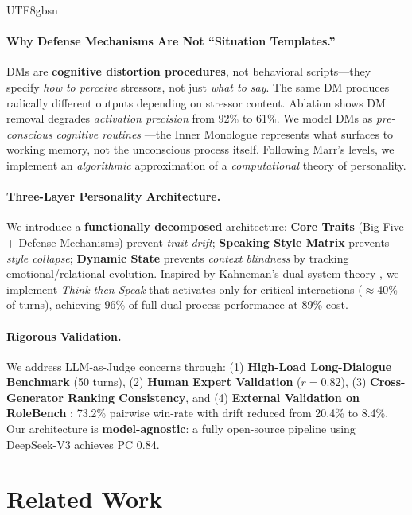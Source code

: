 \documentclass[11pt]{article}
\begin{document}
\begin{CJK*}{UTF8}{gbsn}
\paragraph{Why Defense Mechanisms Are Not ``Situation Templates.''} DMs are \textbf{cognitive distortion procedures}, not behavioral scripts---they specify \textit{how to perceive} stressors, not just \textit{what to say}. The same DM produces radically different outputs depending on stressor content. Ablation shows DM removal degrades \textit{activation precision} from 92\% to 61\%. We model DMs as \textit{pre-conscious cognitive routines} \citep{vaillant1994ego}---the Inner Monologue represents what surfaces to working memory, not the unconscious process itself. Following Marr's levels, we implement an \textit{algorithmic} approximation of a \textit{computational} theory of personality.

\paragraph{Three-Layer Personality Architecture.} We introduce a \textbf{functionally decomposed} architecture: \textbf{Core Traits} (Big Five + Defense Mechanisms) prevent \textit{trait drift}; \textbf{Speaking Style Matrix} prevents \textit{style collapse}; \textbf{Dynamic State} prevents \textit{context blindness} by tracking emotional/relational evolution. Inspired by Kahneman's dual-system theory \citep{kahneman2011thinking}, we implement \textit{Think-then-Speak} that activates only for critical interactions ($\approx$40\% of turns), achieving 96\% of full dual-process performance at 89\% cost.

\paragraph{Rigorous Validation.} We address LLM-as-Judge concerns through: (1) \textbf{High-Load Long-Dialogue Benchmark} (50 turns), (2) \textbf{Human Expert Validation} ($r = 0.82$), (3) \textbf{Cross-Generator Ranking Consistency}, and (4) \textbf{External Validation on RoleBench} \citep{wang2024rolellm}: 73.2\% pairwise win-rate with drift reduced from 20.4\% to 8.4\%. Our architecture is \textbf{model-agnostic}: a fully open-source pipeline using DeepSeek-V3 achieves PC 0.84.


\section{Related Work}


\end{CJK*}
\end{document}
